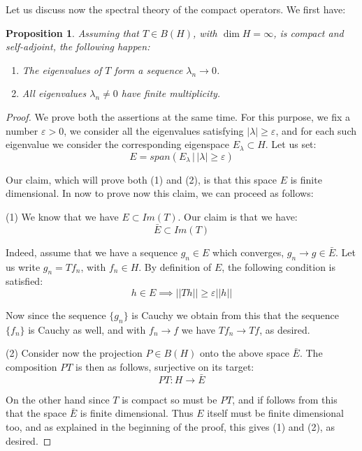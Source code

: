\documentclass[12pt]{amsbook}
\newtheorem{proposition}[theorem]{Proposition}
\begin{document}
Let us discuss now the spectral theory of the compact operators. We first have:

\begin{proposition}
Assuming that $T\in B(H)$, with $\dim H=\infty$, is compact and self-adjoint, the following happen:
\begin{enumerate}
\item The eigenvalues of $T$ form a sequence $\lambda_n\to0$.

\item All eigenvalues $\lambda_n\neq0$ have finite multiplicity.
\end{enumerate}
\end{proposition}

\begin{proof}
We prove both the assertions at the same time. For this purpose, we fix a number $\varepsilon>0$, we consider all the eigenvalues satisfying $|\lambda|\geq\varepsilon$, and for each such eigenvalue we consider the corresponding eigenspace $E_\lambda\subset H$. Let us set:
$$E=span\left(E_\lambda\,\Big|\,|\lambda|\geq\varepsilon\right)$$ 

Our claim, which will prove both (1) and (2), is that this space $E$ is finite dimensional. In now to prove now this claim, we can proceed as follows:

\medskip

(1) We know that we have $E\subset Im(T)$. Our claim is that we have:
$$\bar{E}\subset Im(T)$$

Indeed, assume that we have a sequence $g_n\in E$ which converges, $g_n\to g\in\bar{E}$. Let us write $g_n=Tf_n$, with $f_n\in H$. By definition of $E$, the following condition is satisfied:
$$h\in E\implies||Th||\geq\varepsilon||h||$$

Now since the sequence $\{g_n\}$ is Cauchy we obtain from this that the sequence $\{f_n\}$ is Cauchy as well, and with $f_n\to f$ we have $Tf_n\to Tf$, as desired.

\medskip

(2) Consider now the projection $P\in B(H)$ onto the above space $\bar{E}$. The composition $PT$ is then as follows, surjective on its target:
$$PT:H\to\bar{E}$$

On the other hand since $T$ is compact so must be $PT$, and if follows from this that the space $\bar{E}$ is finite dimensional. Thus $E$ itself must be finite dimensional too, and as explained in the beginning of the proof, this gives (1) and (2), as desired.
\end{proof}
\end{document}
